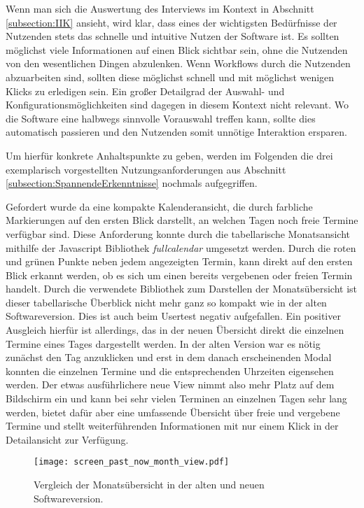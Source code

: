 Wenn man sich die Auswertung des Interviews im Kontext in Abschnitt
\ref{subsection:IIK} ansieht, wird klar, dass eines der wichtigsten Bedürfnisse
der Nutzenden stets das schnelle und intuitive Nutzen der Software ist. Es
sollten möglichst viele Informationen auf einen Blick sichtbar sein, ohne die
Nutzenden von den wesentlichen Dingen abzulenken. Wenn Workflows durch die
Nutzenden abzuarbeiten sind, sollten diese möglichst schnell und mit möglichst
wenigen Klicks zu erledigen sein. Ein großer Detailgrad der Auswahl- und
Konfigurationsmöglichkeiten sind dagegen in diesem Kontext nicht relevant. Wo
die Software eine halbwegs sinnvolle Vorauswahl treffen kann, sollte dies
automatisch passieren und den Nutzenden somit unnötige Interaktion ersparen.

Um hierfür konkrete Anhaltspunkte zu geben, werden im Folgenden die drei
exemplarisch vorgestellten Nutzungsanforderungen aus Abschnitt
\ref{subsection:SpannendeErkenntnisse} nochmals aufgegriffen.

Gefordert wurde da eine kompakte Kalenderansicht, die durch farbliche
Markierungen auf den ersten Blick darstellt, an welchen Tagen noch freie
Termine verfügbar sind. Diese Anforderung konnte durch die tabellarische
Monatsansicht mithilfe der Javascript Bibliothek \textit{fullcalendar}
umgesetzt werden. Durch die roten und grünen Punkte neben jedem angezeigten
Termin, kann direkt auf den ersten Blick erkannt werden, ob es sich um einen
bereits vergebenen oder freien Termin handelt. Durch die verwendete Bibliothek
zum Darstellen der Monatsübersicht ist dieser tabellarische Überblick nicht
mehr ganz so kompakt wie in der alten Softwareversion. Dies ist auch \ipName
beim Usertest negativ aufgefallen. Ein positiver Ausgleich hierfür ist
allerdings, das in der neuen Übersicht direkt die einzelnen Termine eines Tages
dargestellt werden. In der alten Version war es nötig zunächst den Tag
anzuklicken und erst in dem danach erscheinenden Modal konnten die einzelnen
Termine und die entsprechenden Uhrzeiten eigensehen werden. Der etwas
ausführlichere neue View nimmt also mehr Platz auf dem Bildschirm ein und kann
bei sehr vielen Terminen an einzelnen Tagen sehr lang werden, bietet dafür aber
eine umfassende Übersicht über freie und vergebene Termine und stellt
weiterführenden Informationen mit nur einem Klick in der Detailansicht zur
Verfügung.

\begin{figure}[H]
    \caption{Vergleich der Monatsübersicht in der alten und neuen Softwareversion.}
    \centering
    \texttt{[image: screen\_past\_now\_month\_view.pdf]}
\end{figure}

